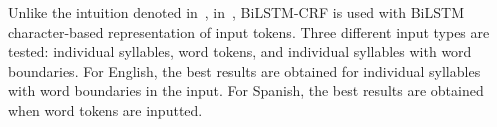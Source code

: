 Unlike the intuition denoted in~\cite{MetricalTaggingInTheWild}, in~\cite{ComparisonFeatureBasedNeualScansion}, BiLSTM-CRF is used with BiLSTM character-based representation of input tokens. Three different input types are tested: individual syllables, word tokens, and individual syllables with word boundaries. For English, the best results are obtained for individual syllables with word boundaries in the input. For Spanish, the best results are obtained when word tokens are inputted.